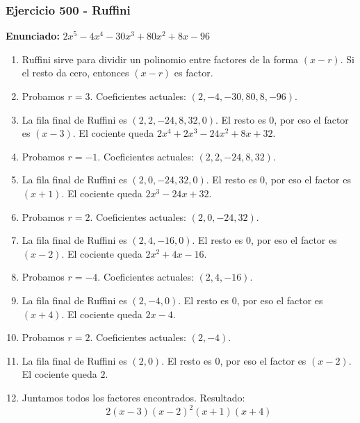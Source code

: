 \documentclass[11pt,a4paper]{article}
\begin{document}
\subsubsection*{Ejercicio 500 - Ruffini}
\textbf{Enunciado:} $ 2 x^{5} - 4 x^{4} - 30 x^{3} + 80 x^{2} + 8 x - 96 $\par
\begin{enumerate}[leftmargin=2em]
\item Ruffini sirve para dividir un polinomio entre factores de la forma \((x-r)\). Si el resto da cero, entonces \((x-r)\) es factor.
\item Probamos \(r=3\). Coeficientes actuales: \((2, -4, -30, 80, 8, -96)\).
\item La fila final de Ruffini es \((2, 2, -24, 8, 32, 0)\). El resto es \(0\), por eso el factor es \((x-3)\). El cociente queda \(2 x^{4} + 2 x^{3} - 24 x^{2} + 8 x + 32\).
\item Probamos \(r=-1\). Coeficientes actuales: \((2, 2, -24, 8, 32)\).
\item La fila final de Ruffini es \((2, 0, -24, 32, 0)\). El resto es \(0\), por eso el factor es \((x+1)\). El cociente queda \(2 x^{3} - 24 x + 32\).
\item Probamos \(r=2\). Coeficientes actuales: \((2, 0, -24, 32)\).
\item La fila final de Ruffini es \((2, 4, -16, 0)\). El resto es \(0\), por eso el factor es \((x-2)\). El cociente queda \(2 x^{2} + 4 x - 16\).
\item Probamos \(r=-4\). Coeficientes actuales: \((2, 4, -16)\).
\item La fila final de Ruffini es \((2, -4, 0)\). El resto es \(0\), por eso el factor es \((x+4)\). El cociente queda \(2 x - 4\).
\item Probamos \(r=2\). Coeficientes actuales: \((2, -4)\).
\item La fila final de Ruffini es \((2, 0)\). El resto es \(0\), por eso el factor es \((x-2)\). El cociente queda \(2\).
\item Juntamos todos los factores encontrados. Resultado: \[\boxed{2 \left(x - 3\right) \left(x - 2\right)^{2} \left(x + 1\right) \left(x + 4\right)}\]
\end{enumerate}

\vspace{0.2cm}
\end{document}
